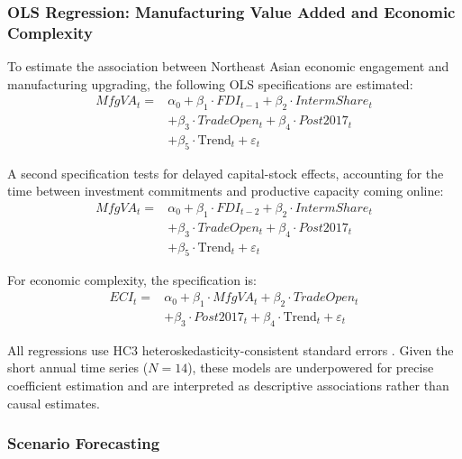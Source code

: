\subsubsection{OLS Regression: Manufacturing Value Added and Economic Complexity}

To estimate the association between Northeast Asian economic engagement and manufacturing upgrading, the following OLS specifications are estimated:
\begin{equation}
\begin{aligned}
 MfgVA_t ={}& \alpha_0 + \beta_1 \cdot FDI_{t-1} + \beta_2 \cdot IntermShare_t \\
 &+ \beta_3 \cdot TradeOpen_t + \beta_4 \cdot Post2017_t \\
 &+ \beta_5 \cdot \text{Trend}_t + \varepsilon_t
\end{aligned}
 \label{eq:ols_mfg}
\end{equation}

A second specification tests for delayed capital-stock effects, accounting for the time between investment commitments and productive capacity coming online:
\begin{equation}
\begin{aligned}
 MfgVA_t ={}& \alpha_0 + \beta_1 \cdot FDI_{t-2} + \beta_2 \cdot IntermShare_t \\
 &+ \beta_3 \cdot TradeOpen_t + \beta_4 \cdot Post2017_t \\
 &+ \beta_5 \cdot \text{Trend}_t + \varepsilon_t
\end{aligned}
 \label{eq:ols_mfg2}
\end{equation}

For economic complexity, the specification is:
\begin{equation}
\begin{aligned}
 ECI_t ={}& \alpha_0 + \beta_1 \cdot MfgVA_t + \beta_2 \cdot TradeOpen_t \\
 &+ \beta_3 \cdot Post2017_t + \beta_4 \cdot \text{Trend}_t + \varepsilon_t
\end{aligned}
 \label{eq:ols_eci}
\end{equation}

All regressions use HC3 heteroskedasticity-consistent standard errors \citep{mackinnon1985}. Given the short annual time series ($N = 14$), these models are underpowered for precise coefficient estimation and are interpreted as descriptive associations rather than causal estimates.

\subsubsection{Scenario Forecasting}

